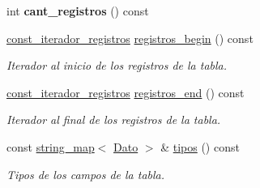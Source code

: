 \begin{DoxyCompactItemize}
\item 
\hypertarget{classTabla_ae25724a86075dd5121b07446c92e94c6}{int {\bfseries cant\-\_\-registros} () const }\label{classTabla_ae25724a86075dd5121b07446c92e94c6}

\item 
\hyperlink{classTabla_1_1const__iterador__registros}{const\-\_\-iterador\-\_\-registros} \hyperlink{classTabla_aafc1aedd4c2c222387591c3b772d56a9}{registros\-\_\-begin} () const 
\begin{DoxyCompactList}\small\item\em Iterador al inicio de los registros de la tabla. \end{DoxyCompactList}\item 
\hyperlink{classTabla_1_1const__iterador__registros}{const\-\_\-iterador\-\_\-registros} \hyperlink{classTabla_ac736bbd3065cc25c36ef258fcddaea50}{registros\-\_\-end} () const 
\begin{DoxyCompactList}\small\item\em Iterador al final de los registros de la tabla. \end{DoxyCompactList}\item 
const \hyperlink{classstring__map}{string\-\_\-map}$<$ \hyperlink{classDato}{Dato} $>$ \& \hyperlink{classTabla_a6d13f7fd32f4ea1eb9f8cf3bdbeb9439}{tipos} () const 
\begin{DoxyCompactList}\small\item\em Tipos de los campos de la tabla. \end{DoxyCompactList}\end{DoxyCompactItemize}
